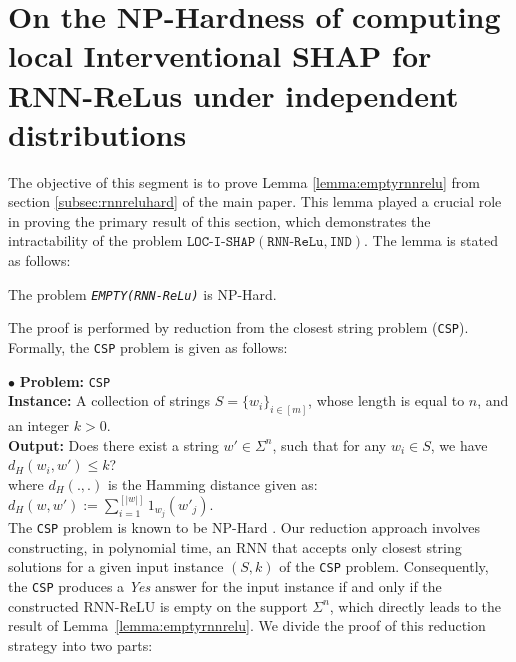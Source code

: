 \section{On the NP-Hardness of computing local Interventional SHAP for RNN-ReLus under independent distributions} 
\label{app:ISHAPRNN}
The objective of this segment is to prove Lemma \ref{lemma:emptyrnnrelu} from section \ref{subsec:rnnreluhard} of the main paper. This lemma played a crucial role in proving the primary result of this section, which demonstrates the intractability of the problem $\texttt{LOC-I-SHAP}(\texttt{RNN-ReLu}, \texttt{IND})$.  The lemma is stated as follows:

\begin{unumberedlemma}
    The problem \texttt{\emph{EMPTY}}\texttt{\emph{(RNN-ReLu)}} is NP-Hard. 
\end{unumberedlemma}

The proof is performed by reduction from the closest string problem (\texttt{CSP}). Formally, the \texttt{CSP} problem is given as follows:

$\bullet$ \textbf{Problem:} \texttt{CSP} \\
    \textbf{Instance:} A collection of strings $S = \{w_{i}\}_{i \in [m]}$, whose length is equal to $n$, and an integer $k > 0$. \\ 
      \textbf{Output:} Does there exist a string $w' \in \Sigma^{n}$, such that for any $w_{i} \in S$, we have $d_{H}(w_{i}, w') \leq k$?  \\ 
        where $d_{H}(.,.)$ is the Hamming distance given as: $d_{H}(w,w') := \sum\limits_{i=1}^{ [|w|]} \mathrm{1}_{w_{j}}(w'_{j})$. \\
     
The \texttt{CSP} problem is known to be NP-Hard \citep{li2000closest}. Our reduction approach involves constructing, in polynomial time, an RNN that accepts only closest string solutions for a given input instance $(S,k)$ of the \texttt{CSP} problem. Consequently, the \texttt{CSP} produces a \textit{Yes} answer for the input instance if and only if the constructed RNN-ReLU is empty on the support $\Sigma^{n}$, which directly leads to the result of Lemma~\ref{lemma:emptyrnnrelu}. We divide the proof of this reduction strategy into two parts:
     

